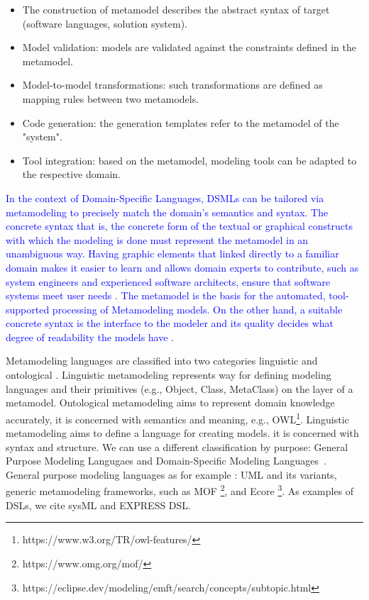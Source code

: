 \begin{itemize}
\item The construction of metamodel describes the abstract syntax of target (software languages, solution system).
\item Model validation: models are validated against the constraints defined in the metamodel. 
\item Model-to-model transformations: such transformations are defined as mapping rules between two metamodels.
\item Code generation: the generation templates refer to the metamodel of the "system". 
\item Tool integration: based on the metamodel, modeling tools can be adapted to the respective domain. 
\end{itemize}

\textcolor{blue}{
In the context of Domain-Specific Languages, DSMLs can be tailored via metamodeling to precisely match the domain's semantics and syntax. The concrete syntax that is, the concrete form of the textual or graphical constructs with which the modeling is done must represent the metamodel in an unambiguous way. Having graphic elements that linked directly to a familiar domain makes it easier to learn and allows domain  experts to contribute, such as system engineers and experienced software architects, ensure that software systems meet user needs \cite{volter2013model}. The metamodel is the basis for the automated, tool-supported processing of Metamodeling models. On the other hand, a suitable concrete syntax is the interface to the modeler and its quality decides what degree of readability the models have \cite{stahl2006model}.
}


Metamodeling languages are classified into two categories linguistic and ontological \cite{gavsevic2007metamodeling}. Linguistic metamodeling represents  way for defining modeling languages and their primitives (e.g., Object, Class, MetaClass) on the layer of a metamodel. Ontological metamodeling aims to represent domain knowledge accurately, it is concerned with semantics and meaning, e.g., OWL\footnote{https://www.w3.org/TR/owl-features/}. Linguistic metamodeling aims to define a language for creating models. it is concerned with syntax and structure.
We can use a different classification by purpose: General Purpose Modeling Langugaes and Domain-Specific Modeling Languages~\cite{de2012domain}. General purpose modeling languages as for example : UML and its variants, generic metamodeling frameworks, such as MOF \footnote{https://www.omg.org/mof/}, and Ecore \footnote{https://eclipse.dev/modeling/emft/search/concepts/subtopic.html}. As examples of DSLs, we cite sysML and EXPRESS DSL.

